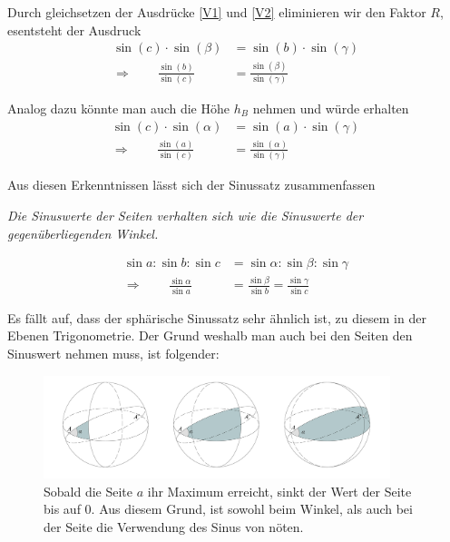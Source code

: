\begin{refsection}
Durch gleichsetzen der Ausdrücke \eqref{V1} und \eqref{V2} eliminieren wir den Faktor $R$, esentsteht der Ausdruck
\begin{align*}
\sin(c) \cdot \sin(\beta) &= \sin(b) \cdot \sin(\gamma) \\
\Rightarrow \quad \quad
\frac{\sin (b)}{\sin (c)} &= \frac{\sin (\beta)}{\sin (\gamma)}
\end{align*}

Analog dazu könnte man auch die Höhe $h_{B}$ nehmen und würde erhalten
\begin{align*}
\sin(c) \cdot \sin(\alpha) &= \sin(a) \cdot \sin(\gamma) \\
\Rightarrow \quad \quad
\frac{\sin (a)}{\sin (c)} &= \frac{\sin (\alpha)}{\sin (\gamma)}
\end{align*}

Aus diesen Erkenntnissen lässt sich der Sinussatz zusammenfassen
\begin{satz}\textit{Die Sinuswerte der Seiten verhalten sich wie die Sinuswerte der gegenüberliegenden Winkel.}
\label{skript:kugel:satz:Sinussatz}
\end{satz}

\begin{align*}
\sin a : \sin b : \sin c &= \sin \alpha : \sin \beta : \sin \gamma \\
\Rightarrow \quad \quad
\frac{\sin \alpha} {\sin a} &= \frac{\sin \beta} {\sin b} = \frac{\sin \gamma} {\sin c}
\end{align*} 

Es fällt auf, dass der sphärische Sinussatz sehr ähnlich ist, zu diesem in der Ebenen Trigonometrie.
Der Grund weshalb man auch bei den Seiten den Sinuswert nehmen muss, ist folgender:

\begin{figure}[htbp]
\centering
\includegraphics[width=0.9\textwidth]{kugel/SinussatzB.jpg}
\caption{Sobald die Seite $a$ ihr Maximum erreicht, sinkt der Wert der Seite bis auf 0. Aus diesem Grund, ist sowohl beim Winkel, als auch bei der Seite die Verwendung des Sinus von nöten.}
\end{figure}


\end{refsection}
